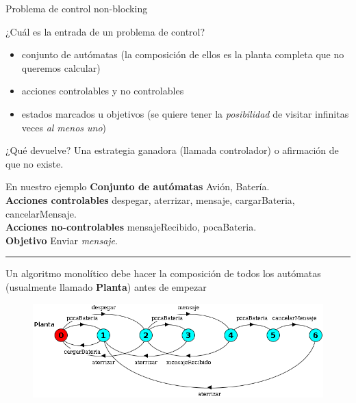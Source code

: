 \begin{frame}{Problema de control non-blocking}
    \begin{block}{¿Cuál es la entrada de un problema de control?}
        \begin{itemize}
          \item conjunto de autómatas (la composición de ellos es la planta completa que no queremos calcular)
          \item acciones controlables y no controlables
          \item estados marcados u objetivos (se quiere tener la \textit{posibilidad} de visitar infinitas veces \textit{al menos uno})
        \end{itemize}
    \end{block}

    \begin{block}{¿Qué devuelve?}
        Una estrategia ganadora (llamada controlador) o afirmación de que no existe.
    \end{block}

\end{frame}
\begin{frame}{En nuestro ejemplo}
    \textbf{Conjunto de autómatas} Avión, Batería.\\
    \textbf{Acciones controlables} despegar, aterrizar, mensaje, cargarBateria, cancelarMensaje.\\
    \textbf{Acciones no-controlables} mensajeRecibido, pocaBateria.\\
    \textbf{Objetivo} Enviar \textit{mensaje}.
    
    \vspace{-10pt}\noindent\rule{\textwidth}{0.2pt}
    Un algoritmo monolítico debe hacer la composición de todos los autómatas (usualmente llamado \textbf{Planta}) antes de empezar
    \begin{figure}
     \includegraphics[width=\textwidth]{figures/planta.png}
    \end{figure}
    
\end{frame}
